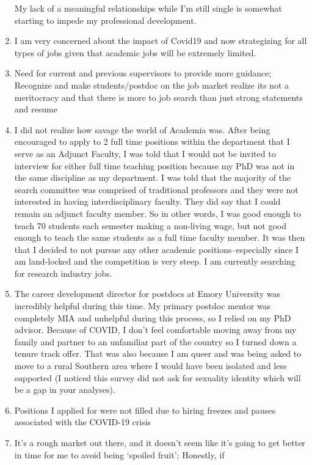 \documentclass[]{article}
\begin{document}
\begin{enumerate}
  My lack of a meaningful relationships while I'm still single is
  somewhat starting to impede my professional development.
\item
  I am very concerned about the impact of Covid19 and now strategizing
  for all types of jobs given that academic jobs will be extremely
  limited.
\item
  Need for current and previous supervisors to provide more guidance;
  Recognize and make students/postdoc on the job market realize its not
  a meritocracy and that there is more to job search than just strong
  statements and resume
\item
  I did not realize how savage the world of Academia was. After being
  encouraged to apply to 2 full time positions within the department
  that I serve as an Adjunct Faculty, I was told that I would not be
  invited to interview for either full time teaching position because my
  PhD was not in the same discipline as my department. I was told that
  the majority of the search committee was comprised of traditional
  professors and they were not interested in having interdisciplinary
  faculty. They did say that I could remain an adjunct faculty member.
  So in other words, I was good enough to teach 70 students each
  semester making a non-living wage, but not good enough to teach the
  same students as a full time faculty member. It was then that I
  decided to not pursue any other academic positions--especially since I
  am land-locked and the competition is very steep. I am currently
  searching for research industry jobs.
\item
  The career development director for postdocs at Emory University was
  incredibly helpful during this time. My primary postdoc mentor was
  completely MIA and unhelpful during this process, so I relied on my
  PhD advisor. Because of COVID, I don't feel comfortable moving away
  from my family and partner to an unfamiliar part of the country so I
  turned down a tenure track offer. That was also because I am queer and
  was being asked to move to a rural Southern area where I would have
  been isolated and less supported (I noticed this survey did not ask
  for sexuality identity which will be a gap in your analyses).
\item
  Positions I applied for were not filled due to hiring freezes and
  pauses associated with the COVID-19 crisis
\item
  It's a rough market out there, and it doesn't seem like it's going to
  get better in time for me to avoid being `spoiled fruit'; Honestly, if

\end{enumerate}
\end{document}
